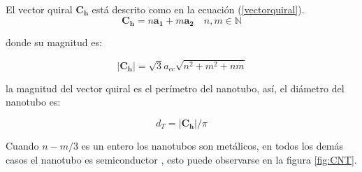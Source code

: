 El vector quiral $\mathbf{C_h}$ está descrito como en la ecuación (\ref{vectorquiral}).\\

\begin{equation} \label{vectorquiral}
    \mathbf{C_h} = n\mathbf{a_1} + m\mathbf{a_2}\quad n,m\in \mathbb{N}
\end{equation}

donde su magnitud es:

\begin{equation} \label{magnvectorquiral}
    \left|\mathbf{C_h}\right| = \sqrt{3}a_{cc}\sqrt{n^2+m^2+nm}
\end{equation}

la magnitud del vector quiral es el perímetro del nanotubo, así, el diámetro del nanotubo es:

\begin{equation} \label{diametroCNT}
    d_T = \left|\mathbf{C_h}\right|/\pi
\end{equation}






Cuando $n-m/3$ es un entero los nanotubos son metálicos, en todos los demás casos el nanotubo es semiconductor \cite{Melendez2016}, esto puede observarse en la figura \ref{fig:CNT}.\\

